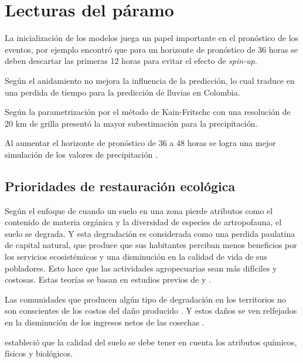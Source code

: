 \section{Lecturas del páramo}

La inicialización de los modelos juega un papel importante en el pronóstico de los eventos, por ejemplo \citet{Uribe2012} encontró que para un horizonte de pronóstico de 36 horas se deben descartar las primeras 12 horas para evitar el efecto de \textit{spin-up}.

Según \citep{Uribe2012} el anidamiento no mejora la influencia de la predicción, lo cual traduce en una perdida de tiempo para la predicción de lluvias en Colombia.

Según \citep{Uribe2012} la parametrización por el método de Kain-Fritschc con una resolución de 20 km de grilla presentó la mayor subestimación para la precipitación.

Al aumentar el horizonte de pronóstico de 36 a 48 horas se logra una mejor simulación de los valores de precipitación \citep{Uribe2012}.



\subsection{Prioridades de restauración ecológica}




Según el enfoque de \citep{Castro-Romero2014} cuando un suelo en una zona pierde atributos como el contenido de materia orgánica y la diversidad de especies de artropofauna, el suelo se degrada. Y esta degradación es considerada como una perdida paulatina de capital natural, que produce que sus habitantes perciban menos beneficios por los servicios ecosistémicos y una disminución en la calidad de vida de sus pobladores. Esto hace que las actividades agropecuarias sean más difíciles y costosas.
Estas teorías se basan en estudios previos de \citet{daily1997nature} y \citet{westman1977much}.

Las comunidades que producen algún tipo de degradación en los territorios no son conscientes de los costos del daño producido \citep{westman1977much}. Y estos daños se ven relfejados en la disminución de los ingresos netos de las cosechas \citep{Castro-Romero2014}.

\citet{Castro-Romero2014} estableció que la calidad del suelo se debe tener en cuenta los atributos químicos, físicos y biológicos.

